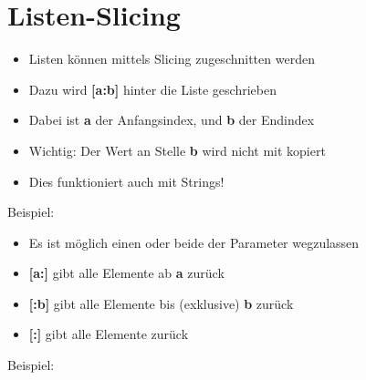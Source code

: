 \livecoding

%
\subtitle{Kapitel 5: ganz viele Variablen in einer}


\section{Listen-Slicing}
\begin{frame}
    \slidehead
    \begin{itemize}
        \item Listen können mittels Slicing zugeschnitten werden
            \pause
        \item Dazu wird \textbf{[a:b]} hinter die Liste geschrieben
        \item Dabei ist \textbf{a} der Anfangsindex, und \textbf{b} der Endindex
            \pause
        \item Wichtig: Der Wert an Stelle \textbf{b} wird nicht mit kopiert
        \item Dies funktioniert auch mit Strings!
    \end{itemize}
    \pause

    \begin{block}{Beispiel:}
    \end{block}
\end{frame}

\begin{frame}
    \slidehead
    \begin{itemize}
        \item Es ist möglich einen oder beide der Parameter wegzulassen
            \pause
        \item \textbf{[a:]} gibt alle Elemente ab \textbf{a} zurück
            \pause
        \item \textbf{[:b]} gibt alle Elemente bis (exklusive) \textbf{b} zurück
            \pause
        \item \textbf{[:]} gibt alle Elemente zurück
    \end{itemize}
    \pause
    \vspace{-0.1cm}
    \begin{block}{Beispiel:}
    \end{block}
\end{frame}


